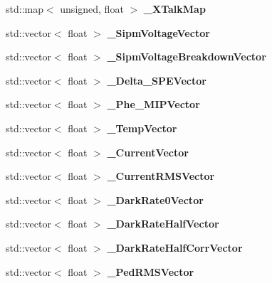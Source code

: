 \begin{DoxyCompactItemize}
\item 
std::map$<$ unsigned, float $>$ {\bfseries \_\-XTalkMap}\label{classCALICE_1_1SiPmPropertiesProcessor_a38d20696ef1e2cb20b0bf86f2351b0d8}

\item 
std::vector$<$ float $>$ {\bfseries \_\-SipmVoltageVector}\label{classCALICE_1_1SiPmPropertiesProcessor_ac8b3a5950031ca74ab882c224042e451}

\item 
std::vector$<$ float $>$ {\bfseries \_\-SipmVoltageBreakdownVector}\label{classCALICE_1_1SiPmPropertiesProcessor_a633aa5eb479e59866e21f038d1428dad}

\item 
std::vector$<$ float $>$ {\bfseries \_\-Delta\_\-SPEVector}\label{classCALICE_1_1SiPmPropertiesProcessor_a59e24efe83279c1ad2d35f4a0ff47978}

\item 
std::vector$<$ float $>$ {\bfseries \_\-Phe\_\-MIPVector}\label{classCALICE_1_1SiPmPropertiesProcessor_a8735696ed23d99a31fe78b9458ca6ea4}

\item 
std::vector$<$ float $>$ {\bfseries \_\-TempVector}\label{classCALICE_1_1SiPmPropertiesProcessor_a062963e5878e6510f5e05ed477f0d7b5}

\item 
std::vector$<$ float $>$ {\bfseries \_\-CurrentVector}\label{classCALICE_1_1SiPmPropertiesProcessor_ac4b06cb71b779bc05186055e15e4d76b}

\item 
std::vector$<$ float $>$ {\bfseries \_\-CurrentRMSVector}\label{classCALICE_1_1SiPmPropertiesProcessor_a048c286afd43ffe74a8a00f17ab1052b}

\item 
std::vector$<$ float $>$ {\bfseries \_\-DarkRate0Vector}\label{classCALICE_1_1SiPmPropertiesProcessor_a9f1349bd2083fc0c83a637e3fec5cbe9}

\item 
std::vector$<$ float $>$ {\bfseries \_\-DarkRateHalfVector}\label{classCALICE_1_1SiPmPropertiesProcessor_a4e424b5ebbb1f20d053d3865be63f53e}

\item 
std::vector$<$ float $>$ {\bfseries \_\-DarkRateHalfCorrVector}\label{classCALICE_1_1SiPmPropertiesProcessor_a6111cc7e9b04e0855f48b4ec5b758190}

\item 
std::vector$<$ float $>$ {\bfseries \_\-PedRMSVector}\label{classCALICE_1_1SiPmPropertiesProcessor_abc8201a9b8ebbfd0943863c3ea44d988}


\end{DoxyCompactItemize}
